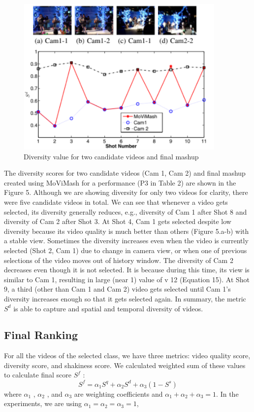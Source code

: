 \documentclass{sig-alternate-05-2015}
\begin{document}
\begin{figure}
\centering
\includegraphics[scale=1]{img5.png}
\caption{Diversity value for two candidate videos and final
mashup}
\end{figure}

The diversity scores for two candidate videos (Cam 1, Cam 2)
and final mashup created using MoViMash for a performance (P3
in Table 2) are shown in the Figure 5. Although we are showing
diversity for only two videos for clarity, there were five candidate
videos in total. We can see that whenever a video gets selected,
its diversity generally reduces, e.g., diversity of Cam 1 after Shot 8
and diversity of Cam 2 after Shot 3. At Shot 4, Cam 1 gets selected
despite low diversity because its video quality is much better than
others (Figure 5.a-b) with a stable view. Sometimes the diversity
increases even when the video is currently selected (Shot 2, Cam 1)
due to change in camera view, or when one of previous selections
of the video moves out of history window. The diversity of Cam 2
decreases even though it is not selected. It is because during this
time, its view is similar to Cam 1, resulting in large (near 1) value
of v 12 (Equation 15). At Shot 9, a third (other than Cam 1 and Cam
2) video gets selected until Cam 1's diversity increases enough so
that it gets selected again. In summary, the metric $S^d$ is able to
capture and spatial and temporal diversity of videos.

\subsection{Final Ranking}
For all the videos of the selected class, we have three metrics:
video quality score, diversity score, and shakiness score. We calculated weighted sum of these values to calculate final score $S^f$ :
\begin{equation}
S^f=\alpha_1S^q+ \alpha_2S^d +\alpha_3(1-S^s )
\end{equation}
where $\alpha_1$ , $\alpha_2$ , and $\alpha_3$ are weighting coefficients and $\alpha_1 +\alpha_2 +
\alpha_3 = 1$. In the experiments, we are using $\alpha_1 =\alpha_2 =
\alpha_3 = 1$,
\end{document}
